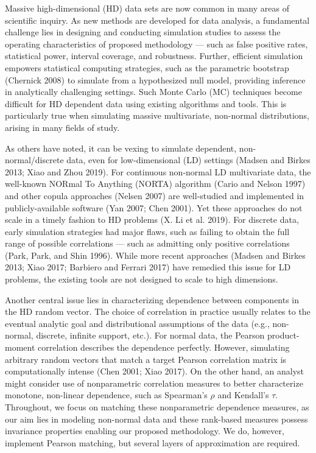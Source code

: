 \documentclass{article}
\begin{document}
Massive high-dimensional (HD) data sets are now common in many areas of
scientific inquiry. As new methods are developed for data analysis, a
fundamental challenge lies in designing and conducting simulation
studies to assess the operating characteristics of proposed methodology
--- such as false positive rates, statistical power, interval coverage,
and robustness. Further, efficient simulation empowers statistical
computing strategies, such as the parametric bootstrap (Chernick 2008)
to simulate from a hypothesized null model, providing inference in
analytically challenging settings. Such Monte Carlo (MC) techniques
become difficult for HD dependent data using existing algorithms and
tools. This is particularly true when simulating massive multivariate,
non-normal distributions, arising in many fields of study.

As others have noted, it can be vexing to simulate dependent,
non-normal/discrete data, even for low-dimensional (LD) settings (Madsen
and Birkes 2013; Xiao and Zhou 2019). For continuous non-normal LD
multivariate data, the well-known NORmal To Anything (NORTA) algorithm
(Cario and Nelson 1997) and other copula approaches (Nelsen 2007) are
well-studied and implemented in publicly-available software (Yan 2007;
Chen 2001). Yet these approaches do not scale in a timely fashion to HD
problems (X. Li et al. 2019). For discrete data, early simulation
strategies had major flaws, such as failing to obtain the full range of
possible correlations --- such as admitting only positive correlations
(Park, Park, and Shin 1996). While more recent approaches (Madsen and
Birkes 2013; Xiao 2017; Barbiero and Ferrari 2017) have remedied this
issue for LD problems, the existing tools are not designed to scale to
high dimensions.

Another central issue lies in characterizing dependence between
components in the HD random vector. The choice of correlation in
practice usually relates to the eventual analytic goal and
distributional assumptions of the data (e.g., non-normal, discrete,
infinite support, etc.). For normal data, the Pearson product-moment
correlation describes the dependence perfectly. However, simulating
arbitrary random vectors that match a target Pearson correlation matrix
is computationally intense (Chen 2001; Xiao 2017). On the other hand, an
analyst might consider use of nonparametric correlation measures to
better characterize monotone, non-linear dependence, such as Spearman's
\(\rho\) and Kendall's \(\tau\). Throughout, we focus on matching these
nonparametric dependence measures, as our aim lies in modeling
non-normal data and these rank-based measures possess invariance
properties enabling our proposed methodology. We do, however, implement
Pearson matching, but several layers of approximation are required.
\end{document}
